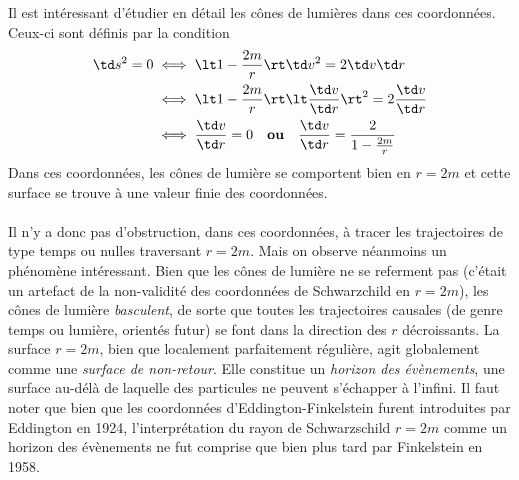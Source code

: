 Il est intéressant d'étudier en détail les cônes de lumières dans ces coordonnées. Ceux-ci sont définis par la condition
\begin{align}
    \td s^2 = 0 &\iff \lt 1 - \frac{2m}{r} \rt \td v^2 = 2 \td v \td r\\
    & \iff \lt 1 - \frac{2m}{r} \rt \lt \frac{\td v}{\td r} \rt^2 = 2 \frac{\td v}{\td r}\\
    & \iff \frac{\td v}{\td r} = 0 \quad \textbf{ou} \quad \frac{\td v}{\td r} = \frac{2}{1 - \frac{2m}{r}}
\end{align}
Dans ces coordonnées, les cônes de lumière se comportent bien en $r=2m$ et cette surface se trouve à une valeur finie des coordonnées.\\
\\
Il n'y a donc pas d'obstruction, dans ces coordonnées, à tracer les trajectoires de type temps ou nulles traversant $r=2m$. Mais on observe néanmoins un phénomène intéressant. Bien que les cônes de lumière ne se referment pas (c'était un artefact de la non-validité des coordonnées de Schwarzchild en $r=2m$), les cônes de lumière \emph{basculent}, de sorte que toutes les trajectoires causales (de genre temps ou lumière, orientés futur) se font dans la direction des $r$ décroissants. La surface $r=2m$, bien que localement parfaitement régulière, agit globalement comme une \emph{surface de non-retour}. Elle constitue un \emph{horizon des évènements}, une surface au-délà de laquelle des particules ne peuvent s'échapper à l'infini. Il faut noter que bien que les coordonnées d'Eddington-Finkelstein furent introduites par Eddington en 1924, l'interprétation du rayon de Schwarzschild $r=2m$ comme un horizon des évènements ne fut comprise que bien plus tard par Finkelstein en 1958.

